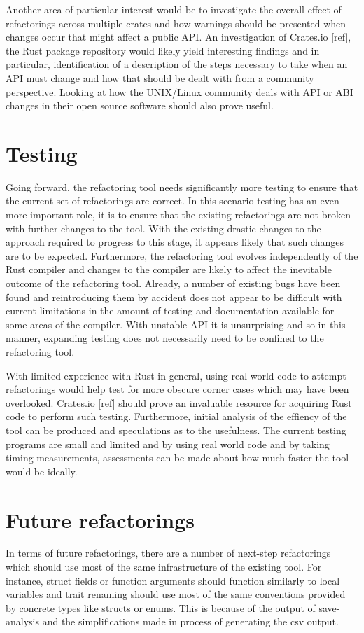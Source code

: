 Another area of particular interest would be to investigate the overall effect of refactorings across multiple crates and how warnings should be presented when changes occur that might affect a public API. An investigation of Crates.io [ref], the Rust package repository would likely yield interesting findings and in particular, identification of a description of the steps necessary to take when an API must change and how that should be dealt with from a community perspective. Looking at how the UNIX/Linux community deals with API or ABI changes in their open source software should also prove useful.

\section{Testing}
Going forward, the refactoring tool needs significantly more testing to ensure that the current set of refactorings are correct. In this scenario testing has an even more important role, it is to ensure that the existing refactorings are not broken with further changes to the tool. With the existing drastic changes to the approach required to progress to this stage, it appears likely that such changes are to be expected. Furthermore, the refactoring tool evolves independently of the Rust compiler and changes to the compiler are likely to affect the inevitable outcome of the refactoring tool. Already, a number of existing bugs have been found and reintroducing them by accident does not appear to be difficult with current limitations in the amount of testing and documentation available for some areas of the compiler. With unstable API it is unsurprising and so in this manner, expanding testing does not necessarily need to be confined to the refactoring tool.

With limited experience with Rust in general, using real world code to attempt refactorings would help test for more obscure corner cases which may have been overlooked. Crates.io [ref] should prove an invaluable resource for acquiring Rust code to perform such testing. Furthermore, initial analysis of the effiency of the tool can be produced and speculations as to the usefulness. The current testing programs are small and limited and by using real world code and by taking timing measurements, assessments can be made about how much faster the tool would be ideally.

\section{Future refactorings}
In terms of future refactorings, there are a number of next-step refactorings which should use most of the same infrastructure of the existing tool. For instance, struct fields or function arguments should function similarly to local variables and trait renaming should use most of the same conventions provided by concrete types like structs or enums. This is because of the output of save-analysis and the simplifications made in process of generating the csv output.

